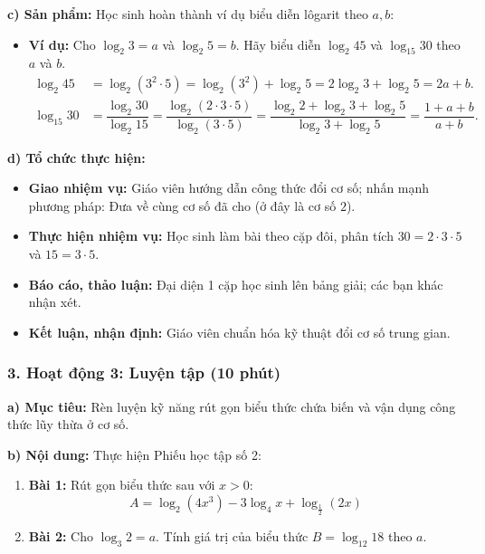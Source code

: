 \documentclass[12pt, a4paper]{article}
\begin{document}
\noindent \textbf{c) Sản phẩm:}
Học sinh hoàn thành ví dụ biểu diễn lôgarit theo $a, b$:
\begin{itemize}
    \item \textbf{Ví dụ:} Cho $\log_2 3 = a$ và $\log_2 5 = b$. Hãy biểu diễn $\log_2 45$ và $\log_{15} 30$ theo $a$ và $b$.
    \begin{align*}
        \log_2 45 &= \log_2 (3^2 \cdot 5) = \log_2 (3^2) + \log_2 5 = 2\log_2 3 + \log_2 5 = 2a + b. \\
        \log_{15} 30 &= \dfrac{\log_2 30}{\log_2 15} = \dfrac{\log_2 (2 \cdot 3 \cdot 5)}{\log_2 (3 \cdot 5)} = \dfrac{\log_2 2 + \log_2 3 + \log_2 5}{\log_2 3 + \log_2 5} = \dfrac{1 + a + b}{a + b}.
    \end{align*}
\end{itemize}

\noindent \textbf{d) Tổ chức thực hiện:}
\begin{itemize}[leftmargin=0.6cm]
    \item \textbf{Giao nhiệm vụ:} Giáo viên hướng dẫn công thức đổi cơ số; nhấn mạnh phương pháp: Đưa về cùng cơ số đã cho (ở đây là cơ số $2$).
    \item \textbf{Thực hiện nhiệm vụ:} Học sinh làm bài theo cặp đôi, phân tích $30 = 2 \cdot 3 \cdot 5$ và $15 = 3 \cdot 5$.
    \item \textbf{Báo cáo, thảo luận:} Đại diện 1 cặp học sinh lên bảng giải; các bạn khác nhận xét.
    \item \textbf{Kết luận, nhận định:} Giáo viên chuẩn hóa kỹ thuật đổi cơ số trung gian.
\end{itemize}

\subsubsection*{3. Hoạt động 3: Luyện tập (10 phút)}

\noindent \textbf{a) Mục tiêu:}
Rèn luyện kỹ năng rút gọn biểu thức chứa biến và vận dụng công thức lũy thừa ở cơ số.

\noindent \textbf{b) Nội dung:}
Thực hiện Phiếu học tập số 2:
\begin{enumerate}[leftmargin=0.6cm]
    \item \textbf{Bài 1:} Rút gọn biểu thức sau với $x > 0$:
    $$A = \log_2 (4x^3) - 3\log_4 x + \log_{\frac{1}{2}} (2x)$$
    \item \textbf{Bài 2:} Cho $\log_3 2 = a$. Tính giá trị của biểu thức $B = \log_{12} 18$ theo $a$.
\end{enumerate}
\end{document}
